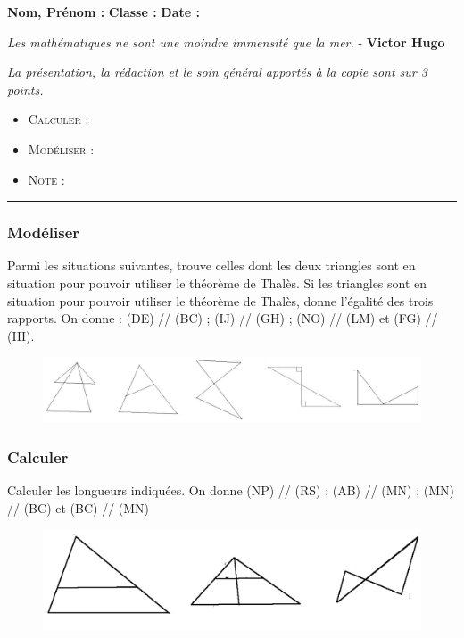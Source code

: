 \documentclass[11pt]{article}
\newcommand{\horrule}[1]{\rule{\linewidth}{#1}} %
\begin{document}
\textbf{Nom, Prénom :} \hspace{8cm} \textbf{Classe :} \hspace{3cm} \textbf{Date :}\\


\begin{center}
  \textit{Les mathématiques ne sont une moindre immensité que la mer.}  - \textbf{Victor Hugo}
\end{center}

\textit{La présentation, la rédaction et le soin général apportés à la copie sont sur 3 points.}
\begin{itemize}
\item \textsc{Calculer} : 
\item \textsc{Modéliser} : 
\item \textsc{Note} : 
\end{itemize}

\horrule{1px}
\vspace{-1cm}

\subsubsection*{Modéliser}
Parmi les situations suivantes, trouve celles dont les deux triangles sont en situation
pour pouvoir utiliser le théorème de Thalès. Si les triangles sont en situation pour pouvoir utiliser le théorème de Thalès, donne
l’égalité des trois rapports.
On donne : (DE) // (BC) ; (IJ) // (GH) ; (NO) // (LM) et (FG) // (HI).

\begin{figure}[H]
  \centering
  \includegraphics[width=0.8\linewidth]{sources/ch5-thales/1_modele.png}
\end{figure}

\subsubsection*{Calculer}

Calculer les longueurs indiquées. On donne (NP) // (RS) ; (AB) // (MN) ; (MN) // (BC) et (BC) // (MN)

\begin{figure}[H]
  \centering
  \includegraphics[width=0.8\linewidth]{sources/ch5-thales/2_longueurs.png}
\end{figure}
\end{document}
